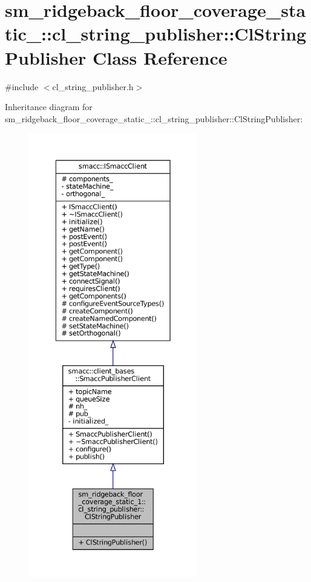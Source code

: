 \hypertarget{classsm__ridgeback__floor__coverage__static__1_1_1cl__string__publisher_1_1ClStringPublisher}{}\section{sm\+\_\+ridgeback\+\_\+floor\+\_\+coverage\+\_\+static\+\_\+:\+:cl\+\_\+string\+\_\+publisher\+:\+:Cl\+String\+Publisher Class Reference}
\label{classsm__ridgeback__floor__coverage__static__1_1_1cl__string__publisher_1_1ClStringPublisher}


{\ttfamily \#include $<$cl\+\_\+string\+\_\+publisher.\+h$>$}



Inheritance diagram for sm\+\_\+ridgeback\+\_\+floor\+\_\+coverage\+\_\+static\+\_\+:\+:cl\+\_\+string\+\_\+publisher\+:\+:Cl\+String\+Publisher\+:
\nopagebreak
\begin{figure}[H]
\begin{center}
\leavevmode
\includegraphics[height=550pt]{classsm__ridgeback__floor__coverage__static__1_1_1cl__string__publisher_1_1ClStringPublisher__inherit__graph}
\end{center}
\end{figure}



